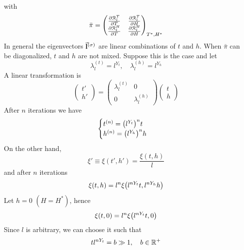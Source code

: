 \documentclass[../main/main.tex]{subfiles}
\begin{document}
with
\begin{equation}
  \bar{\pi } =
  \begin{pmatrix}
     \pdv{\mathcal{R}_l^T}{T} & \pdv{\mathcal{R}_l^T}{H} \\
     \pdv{\mathcal{R}_l^H}{T} & \pdv{\mathcal{R}_l^H}{H}
  \end{pmatrix}_{T^*,H^*}
\end{equation}
In general the eigenvectors \( \va{l}^{(\sigma )} \) are linear combinations of \( t \) and \( h \). When \( \bar{\pi }  \) can be diagonalized, \( t \) and \( h \) are not mixed. Suppose this is the case and let
\begin{equation}
  \lambda _l ^{(t)} = l^{Y_t}, \quad \lambda _l^{(h)} = l ^{Y_h}
\end{equation}
A linear transformation is
\begin{equation}
  \begin{pmatrix}
  t' \\
  h'
  \end{pmatrix}
  =
  \begin{pmatrix}
  \lambda _l^{(t)}   & 0 \\
    0 & \lambda _l^{(h)}
  \end{pmatrix}
  \begin{pmatrix}
  t \\
  h
  \end{pmatrix}
\end{equation}
After \( n \) iterations we have
\begin{equation}
  \begin{cases}
   t^{(n)} = \qty(l^{Y_t})^n t  \\
  h^{(n)} = \qty(l^{Y_h})^n h
  \end{cases}
\end{equation}
On the other hand,
\begin{equation}
  \xi ' \equiv \xi (t',h') = \frac{\xi (t,h)}{l}
\end{equation}
and after \( n \) iterations
\begin{equation}
  \xi (t,h) = l^n \xi \qty(l^{n Y_t} t, l^{n Y_h} h)
\end{equation}
Let \( h=0 \) \( (H=H^*) \), hence
\begin{equation}
  \xi (t,0) = l^n \xi \qty(l^{n Y_t} t , 0)
\end{equation}
Since \( l \) is arbitrary, we can choose it such that
\begin{equation}
  t l ^{n Y_t} = b \gg 1, \quad b \in \mathbb{R}^+
\end{equation}
\end{document}
